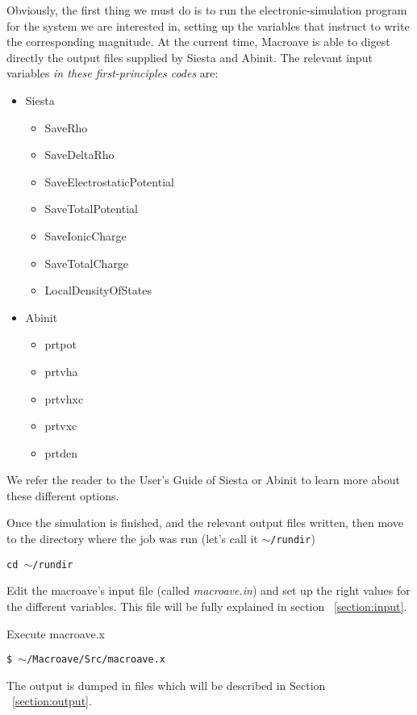  Obviously, the first thing we must do is to run the
 electronic-simulation program
 for the system we are interested in,
 setting up the variables that instruct to write the corresponding
 magnitude.
 At the current time, {\sc Macroave} is able to digest directly
 the output files supplied by {\sc Siesta} and {\sc Abinit}.
 The relevant input variables {\it in these first-principles codes} are:

 \begin{itemize}
    \item {\sc Siesta}
       \begin{itemize}
          \item SaveRho
          \item SaveDeltaRho
          \item SaveElectrostaticPotential
          \item SaveTotalPotential
          \item SaveIonicCharge
          \item SaveTotalCharge
          \item LocalDensityOfStates
       \end{itemize}
    \item {\sc Abinit}
       \begin{itemize}
          \item prtpot
          \item prtvha
          \item prtvhxc
          \item prtvxc
          \item prtden
       \end{itemize}
 \end{itemize}

 We refer the reader to the User's Guide of {\sc Siesta} or {\sc Abinit}
 to learn more about these different options.

 Once the simulation is finished, and the relevant output files
 written, then move to the directory where the job was run (let's call it
 {\tt $\sim$/rundir})

 {\tt cd $\sim$/rundir}


 Edit the {\sc macroave}'s input file (called {\it macroave.in})
 and set up the right values for the different variables. This
 file will be fully explained in section ~\ref{section:input}.

 Execute macroave.x

 {\tt \$ $\sim$/Macroave/Src/macroave.x }

 The output is dumped in files which will be described
 in Section ~\ref{section:output}.

